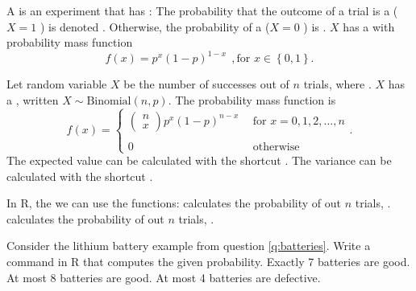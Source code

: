
\begin{tcolorbox}
\bi
\ii A \textbf{} is an experiment that has \textbf{}:
\bi
\ii[$\circ$] The probability that the outcome of a trial is a  ($X=1$ ) is denoted .
\ii[$\circ$] Otherwise, the probability of a  ($X=0$ ) is .
\ii[$\circ$] $X$ has a \textbf{} with probability mass function
\[ f(x) = p^x(1-p)^{1-x} \ \ , \mbox{for } x \in \left\{ 0, 1 \right\}.\]
\ei

\ii Let random variable $X$ be the number of successes out of $n$ trials, where . 
\bi
\ii[$\circ$] $X$ has a \textbf{}, written $X \sim \mbox{Binomial}(n,p)$.
\ii[$\circ$] The probability mass function is
\[ f(x) = \left\{ \begin{array}{ll} \left( \begin{array}{c} n\\ x \end{array} \right) p^x(1-p)^{n-x} \ \ & \mbox{for } x =0,1,2, \ldots , n\\
 & \\
0 \ \ & \mbox{otherwise} \end{array} \right. .\]
\ii[$\circ$] The expected value can be calculated with the shortcut .
\ii[$\circ$] The variance can be calculated with the shortcut .
\ei
\ei
\ebox

\medskip

\begin{tcolorbox}
In R, the we can use the functions:
\bi
\ii {} calculates the probability of  out $n$ trials, . 
\ii {} calculates the probability of  out $n$ trials, . 
\ei
\end{tcolorbox}

\bb[resume]
\ii Consider the lithium battery example from question \ref{q:batteries}. Write a command in R that computes the given probability.
\bb
\ii Exactly 7 batteries are good. \vfill
\ii At most 8 batteries are good. \vfill
\ii At most 4 batteries are defective. \vfill
\ee
\ee

\clearpage



\end{tcolorbox}
